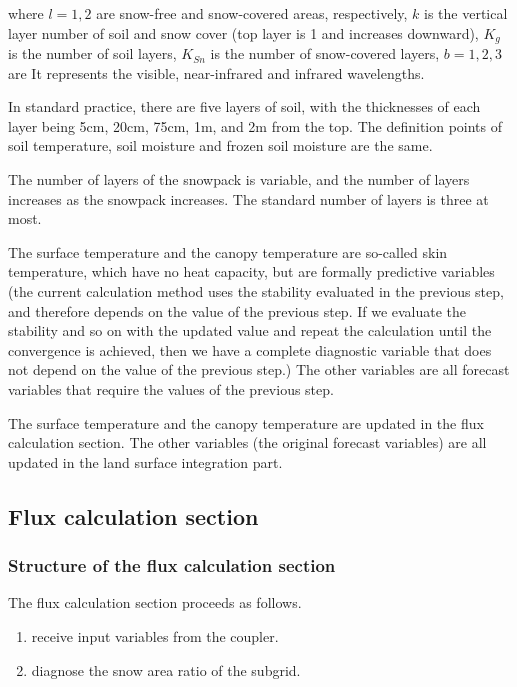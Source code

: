 where \(l=1,2\) are snow-free and snow-covered areas, respectively,
\(k\) is the vertical layer number of soil and snow cover (top layer is
1 and increases downward), \(K_g\) is the number of soil layers,
\(K_{Sn}\) is the number of snow-covered layers, \(b=1,2,3\) are It
represents the visible, near-infrared and infrared wavelengths.

In standard practice, there are five layers of soil, with the
thicknesses of each layer being 5cm, 20cm, 75cm, 1m, and 2m from the
top. The definition points of soil temperature, soil moisture and frozen
soil moisture are the same.

The number of layers of the snowpack is variable, and the number of
layers increases as the snowpack increases. The standard number of
layers is three at most.

The surface temperature and the canopy temperature are so-called skin
temperature, which have no heat capacity, but are formally predictive
variables (the current calculation method uses the stability evaluated
in the previous step, and therefore depends on the value of the previous
step. If we evaluate the stability and so on with the updated value and
repeat the calculation until the convergence is achieved, then we have a
complete diagnostic variable that does not depend on the value of the
previous step.) The other variables are all forecast variables that
require the values of the previous step.

The surface temperature and the canopy temperature are updated in the
flux calculation section. The other variables (the original forecast
variables) are all updated in the land surface integration part.

\hypertarget{flux-calculation-section}{%
\subsection{Flux calculation section}\label{flux-calculation-section}}

\hypertarget{structure-of-the-flux-calculation-section}{%
\subsubsection{Structure of the flux calculation
section}\label{structure-of-the-flux-calculation-section}}

The flux calculation section proceeds as follows.

\begin{enumerate}
\def\labelenumi{\arabic{enumi}.}
\item
  receive input variables from the coupler.
\item
  diagnose the snow area ratio of the subgrid.
\end{enumerate}

